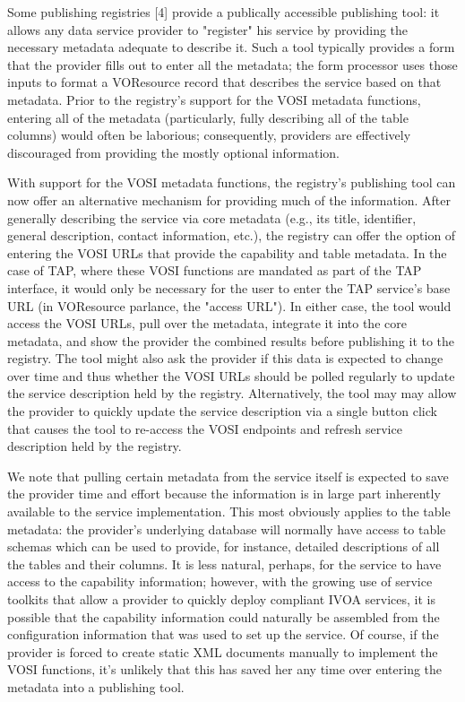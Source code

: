 \documentclass[11pt,letter]{ivoa}
\begin{document}
Some publishing registries [4] provide a publically accessible publishing tool: it allows any data service provider to "register" his service by providing the necessary metadata adequate to describe it. Such a tool typically provides a form that the provider fills out to enter all the metadata; the form processor uses those inputs to format a VOResource record that describes the service based on that metadata. Prior to the registry's support for the VOSI metadata functions, entering all of the metadata (particularly, fully describing all of the table columns) would often be laborious; consequently, providers are effectively discouraged from providing the mostly optional information.

With support for the VOSI metadata functions, the registry's publishing tool can now offer an alternative mechanism for providing much of the information. After generally describing the service via core metadata (e.g., its title, identifier, general description, contact information, etc.), the registry can offer the option of entering the VOSI URLs that provide the capability and table metadata. In the case of TAP, where these VOSI functions are mandated as part of the TAP interface, it would only be necessary for the user to enter the TAP service's base URL (in VOResource parlance, the "access URL"). In either case, the tool would access the VOSI URLs, pull over the metadata, integrate it into the core metadata, and show the provider the combined results before publishing it to the registry. The tool might also ask the provider if this data is expected to change over time and thus whether the VOSI URLs should be polled regularly to update the service description held by the registry. Alternatively, the tool may may allow the provider to quickly update the service description via a single button click that causes the tool to re-access the VOSI endpoints and refresh service description held by the registry.

We note that pulling certain metadata from the service itself is expected to save the provider time and effort because the information is in large part inherently available to the service implementation. This most obviously applies to the table metadata: the provider's underlying database will normally have access to table schemas which can be used to provide, for instance, detailed descriptions of all the tables and their columns. It is less natural, perhaps, for the service to have access to the capability information; however, with the growing use of service toolkits that allow a provider to quickly deploy compliant IVOA services, it is possible that the capability information could naturally be assembled from the configuration information that was used to set up the service. Of course, if the provider is forced to create static XML documents manually to implement the VOSI functions, it's unlikely that this has saved her any time over entering the metadata into a publishing tool.
\end{document}
